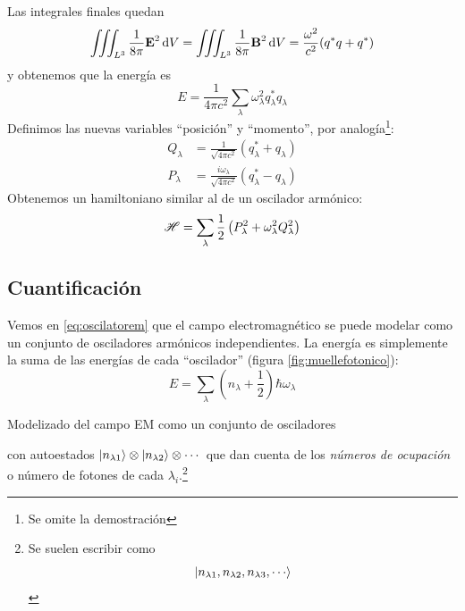 Las integrales finales quedan
\begin{equation}
  \iiint_{L^3} \frac{1}{8\pi} \boldrm{E}^2 \dd{V} = \iiint_{L^3}
  \frac{1}{8\pi}\boldrm{B}^2 \dd{V} = \frac{\omega^2}{c^2} (q^* q + q ^*)
\end{equation}
y obtenemos que la energía es
\begin{equation}
  E = \frac{1}{4\pi c^2} \sum_{\lambda} \omega_\lambda^2 q_\lambda^* q_\lambda
\end{equation}
Definimos las nuevas variables ``posición'' y ``momento'', por
analogía\footnote{Se omite la demostración}:
\begin{align}
 Q_\lambda &= \frac{1}{\sqrt{4\pi c^2}}
(q^*_\lambda + q_\lambda) \\
P_\lambda &= \frac{i\omega_\lambda}{\sqrt{4\pi c^2}}
(q^*_\lambda - q_\lambda)
\end{align}
Obtenemos un hamiltoniano similar al de un
oscilador armónico:
\begin{equation}
  \mathscr{H} = \sum_{ \lambda} \frac{1}{2} \left( P_\lambda^2 +
    \omega_\lambda^2 Q_\lambda^2  \right)
  \label{eq:oscilatorem}
\end{equation}
\subsection{Cuantificación}
Vemos en \eqref{eq:oscilatorem} que el campo electromagnético se puede modelar como un conjunto
de osciladores armónicos independientes. La energía es simplemente la
suma de las energías de cada ``oscilador'' (figura \ref{fig:muellefotonico}):
\begin{equation}
  E = \sum_{ \lambda} \left( n_\lambda + \frac{1}{2} \right) \hbar\omega_\lambda
\end{equation}
\begin{marginfigure}
  \caption{Modelizado del campo EM como un conjunto de osciladores}
  \label{fig:muellefotonico}
\end{marginfigure}
con autoestados $\ket{n_{\lambda1}} \otimes \ket{n_{\lambda2}} \otimes
\cdots$ que dan cuenta de los \emph{números de ocupación} o número de
fotones de cada $\lambda_i$.\footnote{Se suelen escribir como 
  \begin{equation*}
    \ket{n_{\lambda1},n_{\lambda2},n_{\lambda3},\cdots}
  \end{equation*}
}

